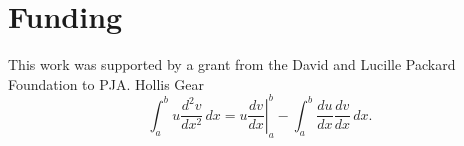 \section{Funding}
\label{funding} 
This work was supported by a grant from the David and Lucille Packard Foundation to PJA. Hollis Gear
\begin{equation}
\label{eqn:drag}
	\int_a^bu\frac{d^2v}{dx^2}\,dx
	=\left.u\frac{dv}{dx}\right|_a^b
	-\int_a^b\frac{du}{dx}\frac{dv}{dx}\,dx.
\end{equation}
